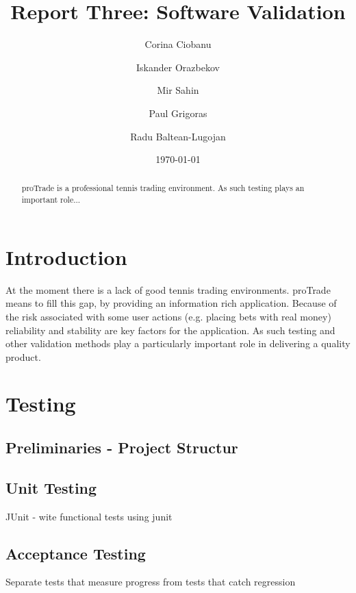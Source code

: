 \documentclass[10pt]{article}
\begin{document}
\title{Report Three: Software Validation}

\author{Corina Ciobanu \and Iskander Orazbekov \and Mir Sahin \and Paul Grigoras \and Radu Baltean-Lugojan}

\date{\today}         %

\maketitle            %

\begin{abstract}
proTrade is a professional tennis trading environment. As such testing plays an important role...
\end{abstract}

\tableofcontents

\section{Introduction}

At the moment there is a lack of good tennis trading environments. proTrade means to fill this gap, by providing an information rich application.
Because of the risk associated with some user actions (e.g. placing bets with real money) reliability and stability are key factors for the application. As such testing and other validation methods play a particularly important role in delivering a quality product.

\section{Testing}

\subsection{Preliminaries - Project Structur}

\subsection{Unit Testing}
JUnit - wite functional tests using junit

\subsection{Acceptance Testing}
Separate tests that measure progress from tests that catch regression
\end{document}
